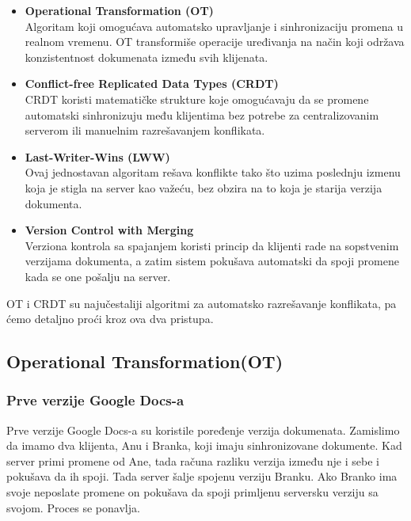 \documentclass[12pt]{article}
\begin{document}
\begin{itemize}
	\item \textbf{Operational Transformation (OT)} \\
	      Algoritam koji omogućava automatsko upravljanje i sinhronizaciju promena u realnom vremenu. OT transformiše operacije uređivanja na način koji održava konzistentnost dokumenata između svih klijenata.
	              
	\item \textbf{Conflict-free Replicated Data Types (CRDT)} \\
	      CRDT koristi matematičke strukture koje omogućavaju da se promene automatski sinhronizuju među klijentima bez potrebe za centralizovanim serverom ili manuelnim razrešavanjem konflikata.
	              
	\item \textbf{Last-Writer-Wins (LWW)} \\
	      Ovaj jednostavan algoritam rešava konflikte tako što uzima poslednju izmenu koja je stigla na server kao važeću, bez obzira na to koja je starija verzija dokumenta.
	              
	\item \textbf{Version Control with Merging} \\
	      Verziona kontrola sa spajanjem koristi princip da klijenti rade na sopstvenim verzijama dokumenta, a zatim sistem pokušava automatski da spoji promene kada se one pošalju na server.
	      
\end{itemize}

OT i CRDT su najučestaliji algoritmi za automatsko razrešavanje konflikata, pa ćemo detaljno proći kroz ova dva pristupa.

\subsection{Operational Transformation(OT)}

\subsubsection{Prve verzije Google Docs-a}

Prve verzije Google Docs-a su koristile poređenje verzija dokumenata. Zamislimo da imamo dva klijenta, Anu i Branka, koji imaju sinhronizovane dokumente. Kad server primi promene od Ane, tada računa razliku verzija između nje i sebe i pokušava da ih spoji. Tada server šalje spojenu verziju Branku. Ako Branko ima svoje neposlate promene on pokušava da spoji primljenu serversku verziju sa svojom. Proces se ponavlja.
\end{document}
